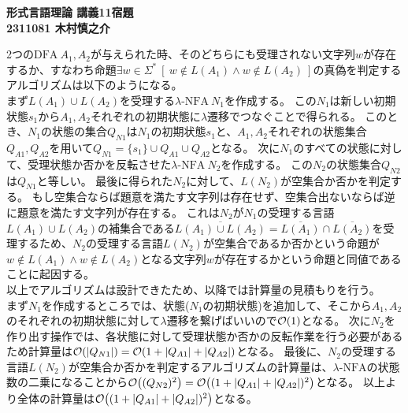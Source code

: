 \documentclass[uplatex,dvipdfmx,a4paper,10pt]{jsarticle}
\begin{document}
    \begin{center}
        {\Large{\bf 形式言語理論 講義11宿題}} \\
        {\bf 2311081 木村慎之介} \\
    \end{center}

    \hspace{1em}2つの\(\text{DFA}\ A_1, A_2\)が与えられた時、そのどちらにも受理されない文字列\(w\)が存在するか、すなわち命題\(\exists w \in \Sigma^*\ [\ w \notin L(A_1) \land w \notin L(A_2)\ ]\)の真偽を判定するアルゴリズムは以下のようになる。 \\
    \indent まず\(L(A_1) \cup L(A_2)\)を受理する\(\lambda\text{-NFA}\ N_1\)を作成する。
    この\(N_1\)は新しい初期状態\(s_1\)から\(A_1,A_2\)それぞれの初期状態に\(\lambda\)遷移でつなぐことで得られる。
    このとき、\(N_1\)の状態の集合\(Q_{N1}\)は\(N_1\)の初期状態\(s_1\)と、\(A_1,A_2\)それぞれの状態集合\(Q_{A1},Q_{A2}\)を用いて\(Q_{N1} = \{s_1\} \cup Q_{A1} \cup Q_{A2}\)となる。
    次に\(N_1\)のすべての状態に対して、受理状態か否かを反転させた\(\lambda\text{-NFA}\ N_2\)を作成する。
    この\(N_2\)の状態集合\(Q_{N2}\)は\(Q_{N1}\)と等しい。
    最後に得られた\(N_2\)に対して、\(L(N_2)\)が空集合か否かを判定する。
    もし空集合ならば題意を満たす文字列は存在せず、空集合出ないならば逆に題意を満たす文字列が存在する。
    これは\(N_2\)が\(N_1\)の受理する言語\(L(A_1) \cup L(A_2)\)の補集合である\(\overline{L(A_1) \cup L(A_2)} = \overline{L(A_1)} \cap \overline{L(A_2)}\)を受理するため、\(N_2\)の受理する言語\(L(N_2)\)が空集合であるか否かという命題が\(w \notin L(A_1) \land w \notin L(A_2)\)となる文字列\(w\)が存在するかという命題と同値であることに起因する。 \\
    \indent 以上でアルゴリズムは設計できたため、以降では計算量の見積もりを行う。\\
    \indent まず\(N_1\)を作成するところでは、状態(\(N_1\)の初期状態)を追加して、そこから\(A_1,A_2\)のそれぞれの初期状態に対して\(\lambda\)遷移を繋げばいいので\(\order{1}\)となる。
    次に\(N_2\)を作り出す操作では、各状態に対して受理状態か否かの反転作業を行う必要があるため計算量は\(\order{|Q_{N1}|} = \order{1 + |Q_{A1}| + |Q_{A2}|}\)となる。
    最後に、\(N_2\)の受理する言語\(L(N_2)\)が空集合か否かを判定するアルゴリズムの計算量は、\(\lambda\text{-NFA}\)の状態数の二乗になることから\(\order{(Q_{N2})^2} = \order{(1 + |Q_{A1}| + |Q_{A2}|)^2}\)となる。
    以上より全体の計算量は\(\order{(1 + |Q_{A1}| + |Q_{A2}|)^2}\)となる。

    
\end{document}
